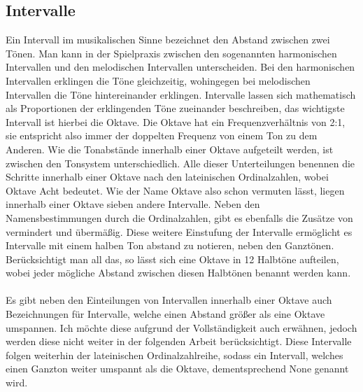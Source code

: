 \subsection*{Intervalle}
\label{sec:Intervalle}
Ein Intervall im musikalischen Sinne bezeichnet den Abstand zwischen zwei Tönen. Man kann in der Spielpraxis zwischen den sogenannten harmonischen Intervallen und den melodischen Intervallen unterscheiden. Bei den harmonischen Intervallen erklingen die Töne gleichzeitig, wohingegen bei melodischen Intervallen die Töne hintereinander erklingen. Intervalle lassen sich mathematisch als Proportionen der erklingenden Töne zueinander beschreiben, das wichtigste Intervall ist hierbei die Oktave. Die Oktave hat ein Frequenzverhältnis von 2:1, 
sie entspricht also immer der doppelten Frequenz von einem Ton zu dem Anderen. Wie die Tonabstände innerhalb einer Oktave aufgeteilt werden, ist zwischen den Tonsystem unterschiedlich. Alle dieser Unterteilungen benennen die Schritte innerhalb einer Oktave nach den lateinischen Ordinalzahlen, wobei Oktave Acht bedeutet. Wie der Name Oktave also schon vermuten lässt, liegen innerhalb einer Oktave sieben andere Intervalle. Neben den Namensbestimmungen durch die Ordinalzahlen, gibt es ebenfalls die Zusätze von vermindert und übermäßig. Diese weitere Einstufung der Intervalle ermöglicht es Intervalle mit einem halben Ton abstand zu notieren, neben den Ganztönen. Berücksichtigt man all das, so lässt sich eine Oktave in 
12 Halbtöne aufteilen, wobei jeder mögliche Abstand zwischen diesen Halbtönen benannt werden kann. \\\\
Es gibt neben den Einteilungen von Intervallen innerhalb einer Oktave auch Bezeichnungen für Intervalle, welche einen Abstand größer als eine Oktave umspannen. Ich möchte diese aufgrund der Vollständigkeit auch erwähnen, jedoch werden diese nicht weiter in der folgenden Arbeit berücksichtigt.
Diese Intervalle folgen weiterhin der lateinischen Ordinalzahlreihe, sodass ein Intervall, welches einen Ganzton weiter umspannt als die Oktave, dementsprechend None genannt wird. \cite{abcmusik}

